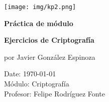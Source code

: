 \documentclass[12pt,oneside,a4paper]{book}
\makeatletter
\renewcommand{\headrulewidth}{0.2pt}
\renewcommand\tableofcontents{%
    \if@twocolumn
      \@restonecoltrue\onecolumn
    \else
      \@restonecolfalse
    \fi
    \section*{\contentsname
        \@mkboth{%
           \MakeUppercase\contentsname}{\MakeUppercase\contentsname}}%
    \@starttoc{toc}%
    \if@restonecol\twocolumn\fi
    }
\makeatother
\begin{document}
\renewcommand{\headrulewidth}{0pt}








\begin{titlepage}
   \thispagestyle{fancy}
   \begin{center}
        \vspace{5em}
   
        \centering\texttt{[image: img/kp2.png]}

        \vspace{5em}

        \huge{\textbf{Práctica de módulo}}

        \vspace{2em}
        
        \huge{\textbf{Ejercicios de Criptografía \\}}
        
        \vspace{7em}

        \Large{por Javier González Espinoza}

        \vspace{7em}
        
   \end{center}

    \normalsize{}
    \normalsize{Date: \today \\
     Módulo: Criptografía \\
     Profesor: Felipe Rodríguez Fonte}
    
\end{titlepage}

\renewcommand{\headrulewidth}{0.2pt}

\newpage

\tableofcontents

\newpage














\end{document}
